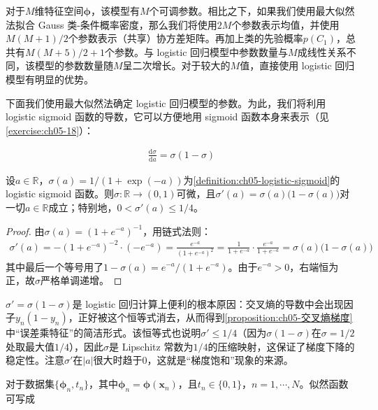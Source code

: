 \documentclass[../../main.tex]{subfiles}
\begin{document}
对于$M$维特征空间$\boldsymbol{\phi}$，该模型有$M$个可调参数。相比之下，如果我们使用最大似然法拟合 Gauss 类-条件概率密度，那么我们将使用$2M$个参数表示均值，并使用$M(M+1)/2$个参数表示（共享）协方差矩阵。再加上类的先验概率$p(C_1)$，总共有$M(M+5)/2+1$个参数。与 logistic 回归模型中参数数量与$M$成线性关系不同，该模型的参数数量随$M$呈二次增长。对于较大的$M$值，直接使用 logistic 回归模型有明显的优势。

下面我们使用最大似然法确定 logistic 回归模型的参数。为此，我们将利用 logistic sigmoid 函数的导数，它可以方便地用 sigmoid 函数本身来表示（见\cref{exercise:ch05-18}）：

\begin{align}
  \frac{\mathrm{d}\sigma}{\mathrm{d}a}=\sigma(1-\sigma)
  \label{align:ch05-sigmoid导数}
\end{align}

\begin{proposition}\label{proposition:ch05-sigmoid导数}
设$a\in\mathbb{R}$，$\sigma(a)=1/(1+\exp(-a))$为\cref{definition:ch05-logistic-sigmoid}的 logistic sigmoid 函数。则$\sigma:\mathbb{R}\to(0,1)$可微，且$\sigma'(a)=\sigma(a)\bigl(1-\sigma(a)\bigr)$对一切$a\in\mathbb{R}$成立；特别地，$0<\sigma'(a)\leqslant1/4$。
\end{proposition}

\begin{proof}
由$\sigma(a)=(1+e^{-a})^{-1}$，用链式法则：
\begin{align}
  \sigma'(a)=-(1+e^{-a})^{-2}\cdot(-e^{-a})=\frac{e^{-a}}{(1+e^{-a})^{2}}=\frac{1}{1+e^{-a}}\cdot\frac{e^{-a}}{1+e^{-a}}=\sigma(a)\bigl(1-\sigma(a)\bigr)
\end{align}
其中最后一个等号用了$1-\sigma(a)=e^{-a}/(1+e^{-a})$。由于$e^{-a}>0$，右端恒为正，故$\sigma$严格单调递增。
\end{proof}

\begin{remark}
$\sigma'=\sigma(1-\sigma)$是 logistic 回归计算上便利的根本原因：交叉熵的导数中会出现因子$y_n(1-y_n)$，正好被这个恒等式消去，从而得到\cref{proposition:ch05-交叉熵梯度}中“误差乘特征”的简洁形式。该恒等式也说明$\sigma'\leqslant 1/4$（因为$\sigma(1-\sigma)$在$\sigma=1/2$处取最大值$1/4$），因此$\sigma$是 Lipschitz 常数为$1/4$的压缩映射，这保证了梯度下降的稳定性。注意$\sigma'$在$|a|$很大时趋于0，这就是“梯度饱和”现象的来源。
\end{remark}

对于数据集$\{\boldsymbol{\phi}_n,t_n\}$，其中$\boldsymbol{\phi}_n=\boldsymbol{\phi}(\boldsymbol{x}_n)$，且$t_n\in\{0,1\}$，$n=1,\cdots,N$。似然函数可写成
\end{document}
